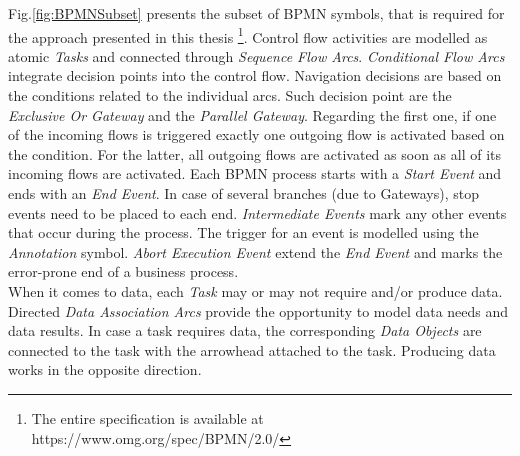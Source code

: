 \noindent
Fig.\ref{fig:BPMNSubset} presents the subset of BPMN symbols, that is required for the approach presented in this thesis \footnote{The entire specification is available at https://www.omg.org/spec/BPMN/2.0/}. Control flow activities are modelled as atomic \textit{Tasks} and connected through \textit{Sequence Flow Arcs}. \textit{Conditional Flow Arcs} integrate decision points into the control flow. Navigation decisions are based on the conditions related to the individual arcs. Such decision point are the \textit{Exclusive Or Gateway} and the \textit{Parallel Gateway}. Regarding the first one, if one of the incoming flows is triggered exactly one outgoing flow is activated based on the condition. For the latter, all outgoing flows are activated as soon as all of its incoming flows are activated. Each BPMN process starts with a \textit{Start Event} and ends with an \textit{End Event}. In case of several branches (due to Gateways), stop events need to be placed to each end. \textit{Intermediate Events} mark any other events that occur during the process. The trigger for an event is modelled using the \textit{Annotation} symbol. \textit{Abort Execution Event} extend the \textit{End Event} and marks the error-prone end of a business process. \\
When it comes to data, each \textit{Task} may or may not require and/or produce data. Directed \textit{Data Association Arcs} provide the opportunity to model data needs and data results. In case a task requires data, the corresponding \textit{Data Objects} are connected to the task with the arrowhead attached to the task. Producing data works in the opposite direction. \\









